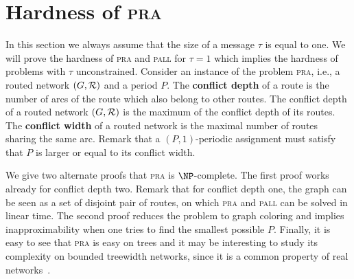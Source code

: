 \documentclass[10pt, conference, letterpaper]{IEEEtran}
\newcommand\pall{\textsc{pall}\xspace}
\newcommand\pra{\textsc{pra}\xspace}
\begin{document}
\section{Hardness of \pra}
  \label{sec:complexity}

 In this section we always assume that the size of a message $\tau$ is equal to one. 
 We will prove the hardness of \pra and \pall for $\tau =1$ which implies the hardness of problems with $\tau$ unconstrained. 
Consider an instance of the problem \pra, i.e., a routed network $(G,\cal{R})$ and a period $P$.
The {\bf conflict depth} of a route is the number of arcs of the route which also belong to other routes.
The conflict depth of a routed network $(G,\cal{R})$ is the maximum of the conflict depth of its routes.
The {\bf conflict width} of a routed network is the maximal number of routes sharing the same arc.
Remark that a $(P,1)$-periodic assignment must satisfy that $P$ is larger or equal to its conflict width.


We give two alternate proofs that \pra is $\NP$-complete.
The first proof works already for conflict depth two. Remark that for conflict depth one,
the graph can be seen as a set of disjoint pair of routes, on which \pra and \pall can be solved in linear time. 
 The second proof reduces the problem to graph coloring and implies inapproximability when one tries to find the smallest possible $P$.  Finally, it is easy to see that \pra is easy on trees and it may be interesting to study its complexity on 
 bounded treewidth networks, since it is a common property of real networks~\cite{de2011treewidth}.
 
\end{document}
